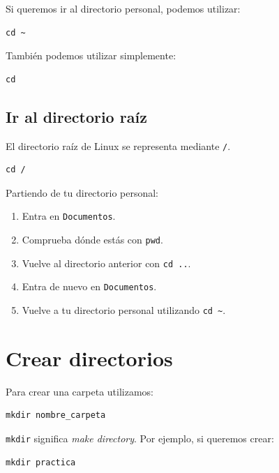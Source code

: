 \documentclass[11pt,a4paper]{article}
\begin{document}
Si queremos ir al directorio personal, podemos utilizar:

\begin{lstlisting}
cd ~
\end{lstlisting}


\noindent También podemos utilizar simplemente:


\begin{lstlisting}
cd
\end{lstlisting}


\subsection{Ir al directorio raíz}


El directorio raíz de Linux se representa mediante \texttt{/}.


\begin{lstlisting}
cd /
\end{lstlisting}


\begin{ejercicio}
Partiendo de tu directorio personal:


\begin{enumerate}
    \item Entra en \texttt{Documentos}.
    \item Comprueba dónde estás con \texttt{pwd}.
    \item Vuelve al directorio anterior con \texttt{cd ..}.
    \item Entra de nuevo en \texttt{Documentos}.
    \item Vuelve a tu directorio personal utilizando
          \texttt{cd \textasciitilde}.
\end{enumerate}
\end{ejercicio}


\section{Crear directorios}


Para crear una carpeta utilizamos:


\begin{lstlisting}
mkdir nombre_carpeta
\end{lstlisting}


\noindent \texttt{mkdir} significa \textit{make directory}. Por ejemplo, si queremos crear:


\begin{lstlisting}
mkdir practica
\end{lstlisting}
\end{document}
